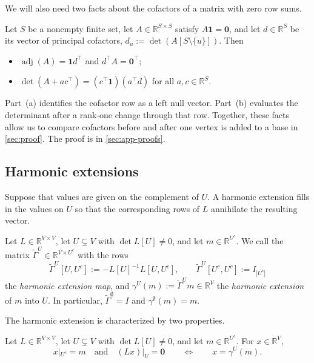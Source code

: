 \documentclass[onefignum,onetabnum]{siamart250211}
\numberwithin{theorem}{section}
\numberwithin{equation}{section}
\newcommand{\R}{\mathbb{R}}
\newcommand{\one}{\mathbf{1}}
\newcommand{\zero}{\mathbf{0}}
\DeclareMathOperator{\adj}{adj}
\begin{document}
We will also need two facts about the cofactors of a matrix with zero
row sums.

\begin{lemma}\label{lem:adj}
Let $S$ be a nonempty finite set, let $A\in\R^{S\times S}$ satisfy
$A\one=\zero$, and let $d\in\R^S$ be its vector of principal
cofactors, $d_u:=\det(A[S\setminus\{u\}])$. Then
\begin{itemize}
\item[(a)] $\adj(A)=\one d^{\top}$ and $d^{\top}A=\zero^{\top}$;
\item[(b)] $\det(A+ac^{\top})=(c^{\top}\one)(a^{\top}d)$ for all
$a,c\in\R^S$.
\end{itemize}
\end{lemma}

Part~(a) identifies the cofactor row as a left null vector. Part~(b)
evaluates the determinant after a rank-one change through that row.
Together, these facts allow us to compare cofactors before and after
one vertex is added to a base in \cref{sec:proof}. The proof is in
\cref{sec:app-proofs}.


\subsection{Harmonic extensions}\label{sec:gammadef}

Suppose that values are given on the complement of $U$. A harmonic
extension fills in the values on $U$ so that the corresponding rows
of $L$ annihilate the resulting vector. 

\begin{definition}\label{def:gamma}
Let $L\in\R^{V\times V}$, let $U\subsetneq V$ with $\det L[U]\ne0$, and let $m\in\R^{U^c}$. We
call the matrix $\tilde\Gamma^U\in\R^{V\times U^c}$ with the rows
\[
\tilde\Gamma^U[U,U^c]:=-L[U]^{-1}L[U,U^c],\qquad
\tilde\Gamma^U[U^c,U^c]:=I_{|U^c|}
\]
the \emph{harmonic extension map}, and $\gamma^U(m):=\tilde\Gamma^Um\in\R^V$
the \emph{harmonic extension} of $m$ into $U$. In particular,
$\tilde\Gamma^{\emptyset}=I$ and $\gamma^{\emptyset}(m)=m$.
\end{definition}


The harmonic extension is characterized by two properties.
\begin{lemma}\label{lem:harmonic-extension}
Let $L\in\R^{V\times V}$, let $U\subsetneq V$ with $\det L[U]\ne0$, and
let $m\in\R^{U^c}$. For $x\in\R^V$,
\[
x|_{U^c}=m\quad\text{and}\quad(Lx)|_U=\zero
\qquad\Longleftrightarrow\qquad x=\gamma^U(m).
\]
\end{lemma}
\end{document}
